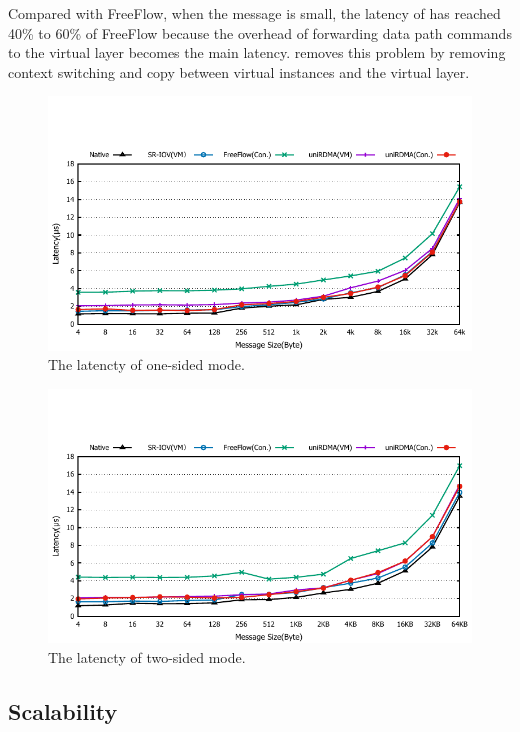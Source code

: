 Compared with FreeFlow, when the message is small, the latency of \sys has reached 40\% to 60\% of FreeFlow because the overhead of forwarding data path commands to the virtual layer becomes the main latency. \sys removes this problem by removing context switching and copy between virtual instances and the virtual layer.


\begin{figure}[!ht]
	\centering
	\includegraphics[width=1.0\linewidth]{images/write-lat.pdf}
	\caption{The latencty of one-sided mode.}
	\label{fig:write-lat}
\end{figure}


\begin{figure}[!ht]
	\centering
	\includegraphics[width=1.0\linewidth]{images/send-lat.pdf}
	\caption{The latencty of two-sided mode.}
	\label{fig:send-lat}
\end{figure}


\subsection{Scalability}

